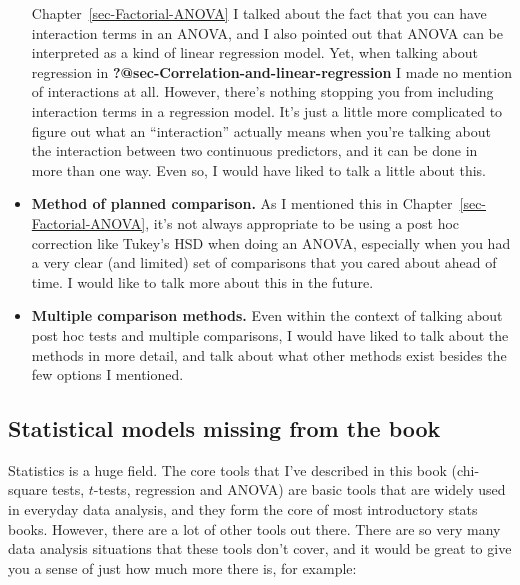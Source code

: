 \documentclass[
  a4paper,
]{book}
\begin{document}
\begin{itemize}
  Chapter~\ref{sec-Factorial-ANOVA} I talked about the fact that you can
  have interaction terms in an ANOVA, and I also pointed out that ANOVA
  can be interpreted as a kind of linear regression model. Yet, when
  talking about regression in
  \textbf{?@sec-Correlation-and-linear-regression} I made no mention of
  interactions at all. However, there's nothing stopping you from
  including interaction terms in a regression model. It's just a little
  more complicated to figure out what an ``interaction'' actually means
  when you're talking about the interaction between two continuous
  predictors, and it can be done in more than one way. Even so, I would
  have liked to talk a little about this.
\item
  \textbf{Method of planned comparison.} As I mentioned this in
  Chapter~\ref{sec-Factorial-ANOVA}, it's not always appropriate to be
  using a post hoc correction like Tukey's HSD when doing an ANOVA,
  especially when you had a very clear (and limited) set of comparisons
  that you cared about ahead of time. I would like to talk more about
  this in the future.
\item
  \textbf{Multiple comparison methods.} Even within the context of
  talking about post hoc tests and multiple comparisons, I would have
  liked to talk about the methods in more detail, and talk about what
  other methods exist besides the few options I mentioned.
\end{itemize}

\hypertarget{statistical-models-missing-from-the-book}{%
\subsection*{Statistical models missing from the
book}\label{statistical-models-missing-from-the-book}}

Statistics is a huge field. The core tools that I've described in this
book (chi-square tests, \(t\)-tests, regression and ANOVA) are basic
tools that are widely used in everyday data analysis, and they form the
core of most introductory stats books. However, there are a lot of other
tools out there. There are so very many data analysis situations that
these tools don't cover, and it would be great to give you a sense of
just how much more there is, for example:
\end{document}

